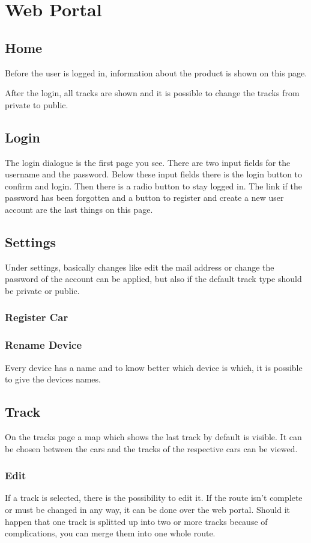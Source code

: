 \section{Web Portal}
\subsection{Home}
Before the user is logged in, information about the product is shown on this page.

After the login, all tracks are shown and it is possible to change the tracks from private to public.
\subsection{Login}
The login dialogue is the first page you see. There are two input fields for the username and the password. Below these input fields there is the login button to confirm and login. Then there is a radio button to stay logged in.
The link if the password has been forgotten and a button to register and create a new user account are the last things on this page.
\subsection{Settings}
Under settings, basically changes like edit the mail address or change the password of the account can be applied, but also if the default track type should be private or public.
\subsubsection{Register Car}

\subsubsection{Rename Device}
Every device has a name and to know better which device is which, it is possible to give the devices names.
\subsection{Track}
On the tracks page a map which shows the last track by default is visible. It can be chosen between the cars and the tracks of the respective cars can be viewed.
\subsubsection{Edit}
If a track is selected, there is the possibility to edit it. If the route isn’t complete or must be changed in any way, it can be done over the web portal. Should it happen that one track is splitted up into two or more tracks because of complications, you can merge them into one whole route.
